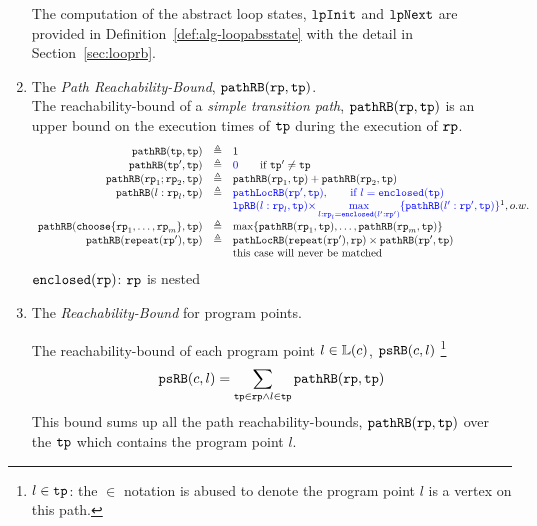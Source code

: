 \begin{enumerate}
      The computation of the abstract loop states, $\mathtt{lpInit}$ and $\mathtt{lpNext}$ are provided in Definition~\ref{def:alg-loopabsstate} with the detail in Section~\ref{sec:looprb}.
  \item The \emph{Path Reachability-Bound}, $\mathtt{pathRB}(\mathtt{rp}, \mathtt{tp}) $.
      \\
      The reachability-bound of a \emph{simple transition path}, $\mathtt{pathRB}(\mathtt{rp}, \mathtt{tp}) $ is an upper bound on the execution times of $\mathtt{tp}$ during the execution of $\mathtt{rp}$.
      \[
        \begin{array}{rcl}
        \inoutB(\tpath, \tpath) & \triangleq & 1  \\
        \inoutB(\tpath', \tpath) & \triangleq & \highlight{0} \qquad \text{if } \tpath' \neq \tpath\\
        \inoutB(\rprog_1;\rprog_2, \tpath) & \triangleq & \inoutB(\rprog_1, \tpath) + \inoutB(\rprog_2, \tpath) \\
        \inoutB(l: \rprog_l, \tpath) & \triangleq & 
        \highlight{\outinB(\rprog', \tpath), \qquad \text{if } l = \kw{enclosed}(\tpath)}
        \\
        &  & 
        \highlight{
        \lpchB(l:\rprog_l, \tpath ) }
        \highlight{\times \max\limits_{l:\rprog_l = \kw{enclosed}(l':\rprog')}
        \{\inoutB(l':\rprog', \tpath)\} } \footnotemark, o.w. \\
        \inoutB(\rpchoose{\rprog_1, \ldots, \rprog_m }, \tpath) & \triangleq 
        & \max\left\{ \inoutB(\rprog_1, \tpath), \ldots, \inoutB(\rprog_m, \tpath) \right\} 
        \\
        \inoutB(\rprepeat(\rprog'), \tpath) & \triangleq & \outinB(\rprepeat(\rprog'), \rprog) \times \inoutB(\rprog', \tpath)\\
        &  & \text{this case will never be matched}
        \end{array}
      \]
      $\mathtt{enclosed}(\mathtt{rp})$:  $\mathtt{rp}$ is nested
  \item The \emph{Reachability-Bound} for program points.

      The reachability-bound of each program point $l \in \mathbb{L}(c)$, $\mathtt{psRB}(c, l)$
      \footnote{$l \in \mathtt{tp}$: the $\in$ notation is abused to denote
      the program point $l$ is a vertex on this path.}
      \[ 
      \mathtt{psRB}(c, l) = 
      \sum\limits_{\mathtt{tp} \in \mathtt{rp} \land 
      l \in \mathtt{tp}} 
      \mathtt{pathRB}(\mathtt{rp}, \mathtt{tp})
      \]
      This bound sums up all the path reachability-bounds, $\mathtt{pathRB}(\mathtt{rp}, \mathtt{tp})$ over the $\mathtt{tp}$ which contains the program point $l$.
%
\end{enumerate}